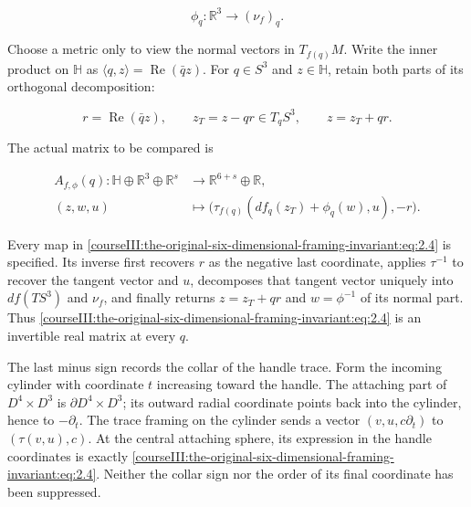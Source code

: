\begin{equation}
\phi_q:\mathbb R^3\longrightarrow(\nu_f)_q.
 \label{courseIII:the-original-six-dimensional-framing-invariant:eq:2.2}
\end{equation}

Choose a metric only to view the normal vectors in \(T_{f(q)}M\). Write the inner product on \(\mathbb H\) as
\(\langle q,z\rangle=\operatorname{Re}(\bar qz)\). For \(q\in S^3\) and \(z\in\mathbb H\), retain both parts of its orthogonal decomposition:

\begin{equation}
r=\operatorname{Re}(\bar qz),\qquad
 z_T=z-qr\in T_qS^3,\qquad z=z_T+qr.
 \label{courseIII:the-original-six-dimensional-framing-invariant:eq:2.3}
\end{equation}

The actual matrix to be compared is

\begin{equation}
\begin{split}
 A_{f,\phi}(q):\mathbb H\oplus\mathbb R^3\oplus\mathbb R^s
       &\longrightarrow\mathbb R^{6+s}\oplus\mathbb R,\\
 (z,w,u)&\longmapsto
 \bigl(\tau_{f(q)}(df_q(z_T)+\phi_q(w),u),-r\bigr).
 \end{split}
 \label{courseIII:the-original-six-dimensional-framing-invariant:eq:2.4}
\end{equation}

Every map in \eqref{courseIII:the-original-six-dimensional-framing-invariant:eq:2.4} is specified. Its inverse first recovers \(r\) as the negative last coordinate, applies \(\tau^{-1}\) to recover the tangent vector and \(u\), decomposes that tangent vector uniquely into \(df(TS^3)\) and \(\nu_f\), and finally returns \(z=z_T+qr\) and \(w=\phi^{-1}\) of its normal part. Thus \eqref{courseIII:the-original-six-dimensional-framing-invariant:eq:2.4} is an invertible real matrix at every \(q\).

The last minus sign records the collar of the handle trace. Form the incoming cylinder with coordinate \(t\) increasing toward the handle. The attaching part of \(D^4\times D^3\) is \(\partial D^4\times D^3\); its outward radial coordinate points back into the cylinder, hence to \(-\partial_t\). The trace framing on the cylinder sends a vector \((v,u,c\partial_t)\) to \((\tau(v,u),c)\). At the central attaching sphere, its expression in the handle coordinates is exactly \eqref{courseIII:the-original-six-dimensional-framing-invariant:eq:2.4}. Neither the collar sign nor the order of its final coordinate has been suppressed.


